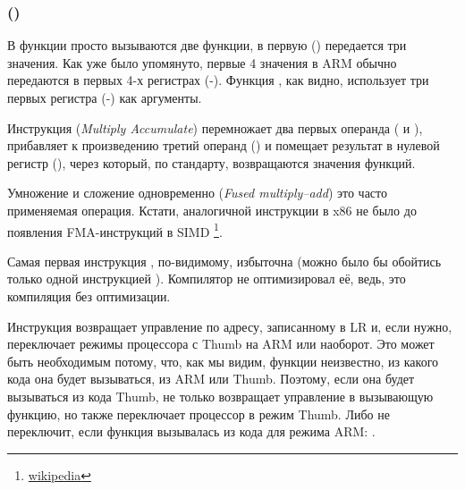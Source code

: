 \subsubsection{\NonOptimizingKeilVI (\ARMMode)}



В функции \main просто вызываются две функции, в первую (\ttf) передается три значения.
Как уже было упомянуто, первые 4 значения в ARM обычно передаются в первых 4-х регистрах (-).
Функция \ttf, как видно, использует три первых регистра (-) как аргументы.

Инструкция  (\emph{Multiply Accumulate}) перемножает два первых операнда ( и ), 
прибавляет к произведению
третий операнд () и помещает результат в нулевой регистр (), через который, по стандарту, 
возвращаются значения функций.

Умножение и сложение одновременно (\emph{Fused multiply–add}) это часто применяемая операция. Кстати, аналогичной
инструкции в x86 не было до появления FMA-инструкций в SIMD
\footnote{\href{https://en.wikipedia.org/wiki/FMA_instruction_set}{wikipedia}}.

Самая первая инструкция , по-видимому, избыточна (можно было бы обойтись только одной инструкцией ).
Компилятор не оптимизировал её, ведь, это компиляция без оптимизации.

Инструкция  возвращает управление по адресу, записанному в \ac{LR} и, если нужно, 
переключает режимы процессора с Thumb на ARM или наоборот.
Это может быть необходимым потому, что, как мы видим, 
функции \ttf неизвестно, из какого кода она будет вызываться, из ARM или Thumb.
Поэтому, если она будет вызываться из кода Thumb,  не только возвращает
управление в вызывающую функцию, но также переключает процессор в режим Thumb.
Либо не переключит, если функция вызывалась из кода для режима ARM: .

